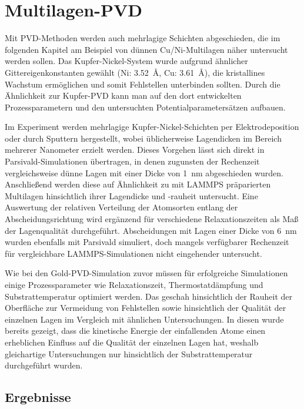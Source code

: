 \section{Multilagen-PVD}
\label{multilayer}

Mit PVD-Methoden werden auch mehrlagige Schichten abgeschieden, die im folgenden Kapitel am Beispiel von dünnen Cu/Ni-Multilagen näher untersucht werden sollen.
Das Kupfer-Nickel-System wurde aufgrund ähnlicher Gittereigenkonstanten gewählt (Ni: \SI{3.52}{\angstrom}, Cu: \SI{3.61}{\angstrom}), die kristallines Wachstum ermöglichen und somit Fehlstellen unterbinden sollten.
Durch die Ähnlichkeit zur Kupfer-PVD kann man auf den dort entwickelten Prozessparametern und den untersuchten Potentialparametersätzen aufbauen.

Im Experiment werden mehrlagige Kupfer-Nickel-Schichten per Elektro\-deposition\cite{yang_pulsed_1995} oder durch Sputtern\cite{cammarata_nanoindentation_1990} hergestellt, wobei üblicherweise Lagendicken im Bereich mehrerer Nanometer erzielt werden.
Dieses Vorgehen lässt sich direkt in Parsivald-Simulationen übertragen, in denen zugunsten der Rechenzeit vergleichsweise dünne Lagen mit einer Dicke von \SI{1}{\nano\meter} abgeschieden wurden.
Anschließend werden diese auf Ähnlichkeit zu mit LAMMPS präparierten Multilagen hinsichtlich ihrer Lagendicke und -rauheit untersucht.
Eine Auswertung der relativen Verteilung der Atomsorten entlang der Abscheidungsrichtung wird ergänzend für verschiedene Relaxationszeiten als Maß der Lagenqualität durchgeführt.
Abscheidungen mit Lagen einer Dicke von \SI{6}{\nano\meter} wurden ebenfalls mit Parsivald simuliert, doch mangels verfügbarer Rechenzeit für vergleichbare LAMMPS-Simulationen nicht eingehender untersucht.

Wie bei den Gold-PVD-Simulation zuvor müssen für erfolgreiche Simulationen einige Prozessparameter wie Relaxationszeit, Thermostatdämpfung und Substrattemperatur optimiert werden.
Das geschah hinsichtlich der Rauheit der Oberfläche zur Vermeidung von Fehlstellen sowie hinsichtlich der Qualität der einzelnen Lagen im Vergleich mit ähnlichen Untersuchungen\cite{zhou_atomistic_1998}.
In diesen wurde bereits gezeigt, dass die kinetische Energie der einfallenden Atome einen erheblichen Einfluss auf die Qualität der einzelnen Lagen hat, weshalb gleichartige Untersuchungen nur hinsichtlich der Substrattemperatur durchgeführt wurden.

\subsection{Ergebnisse}


